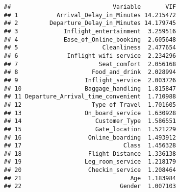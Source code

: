 \documentclass[
]{article}
\newenvironment{Shaded}{\begin{snugshade}}{\end{snugshade}}
\newcommand{\AttributeTok}[1]{\textcolor[rgb]{0.13,0.29,0.53}{#1}}
\newcommand{\CommentTok}[1]{\textcolor[rgb]{0.56,0.35,0.01}{\textit{#1}}}
\newcommand{\ConstantTok}[1]{\textcolor[rgb]{0.56,0.35,0.01}{#1}}
\newcommand{\FunctionTok}[1]{\textcolor[rgb]{0.13,0.29,0.53}{\textbf{#1}}}
\newcommand{\NormalTok}[1]{#1}
\newcommand{\OtherTok}[1]{\textcolor[rgb]{0.56,0.35,0.01}{#1}}
\newcommand{\SpecialCharTok}[1]{\textcolor[rgb]{0.81,0.36,0.00}{\textbf{#1}}}
\begin{document}
\begin{Shaded}
\end{Shaded}

\begin{verbatim}
##                             Variable       VIF
## 1           Arrival_Delay_in_Minutes 14.215472
## 2         Departure_Delay_in_Minutes 14.179745
## 3             Inflight_entertainment  3.259516
## 4             Ease_of_Online_booking  2.605648
## 5                        Cleanliness  2.477654
## 6              Inflight_wifi_service  2.234296
## 7                       Seat_comfort  2.056168
## 8                     Food_and_drink  2.028994
## 9                   Inflight_service  2.003726
## 10                  Baggage_handling  1.815847
## 11 Departure_Arrival_time_convenient  1.710988
## 12                    Type_of_Travel  1.701605
## 13                  On_board_service  1.630928
## 14                     Customer_Type  1.586551
## 15                     Gate_location  1.521229
## 16                   Online_boarding  1.493912
## 17                             Class  1.456328
## 18                   Flight_Distance  1.336138
## 19                  Leg_room_service  1.218179
## 20                   Checkin_service  1.208464
## 21                               Age  1.183984
## 22                            Gender  1.007103
\end{verbatim}
\end{document}

